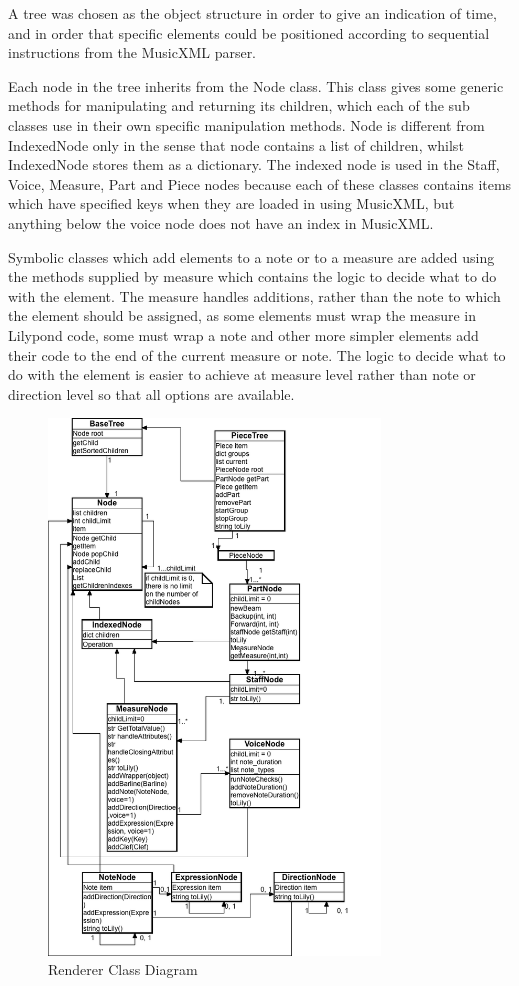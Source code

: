 A tree was chosen as the object structure in order to give an indication of time, and in order that specific elements could be positioned according to sequential instructions from the MusicXML parser. 

Each node in the tree inherits from the Node class. This class gives some generic methods for manipulating and returning its children, which each of the sub classes use in their own specific manipulation methods. Node is different from IndexedNode only in the sense that node contains a list of children, whilst IndexedNode stores them as a dictionary. The indexed node is used in the Staff, Voice, Measure, Part and Piece nodes because each of these classes contains items which have specified keys when they are loaded in using MusicXML, but anything below the voice node does not have an index in MusicXML.

Symbolic classes which add elements to a note or to a measure are added using the methods supplied by measure which contains the logic to decide what to do with the element. The measure handles additions, rather than the note to which the element should be assigned, as some elements must wrap the measure in Lilypond code, some must wrap a note and other more simpler elements add their code to the end of the current measure or note. The logic to decide what to do with the element is easier to achieve at measure level rather than note or direction level so that all options are available.
\begin{figure}[H]
    \centering
    \includegraphics[width=250pt]{diagrams/render-tree.png}
    \caption{Renderer Class Diagram}
    \label{fig:classdiagram}
\end{figure}




